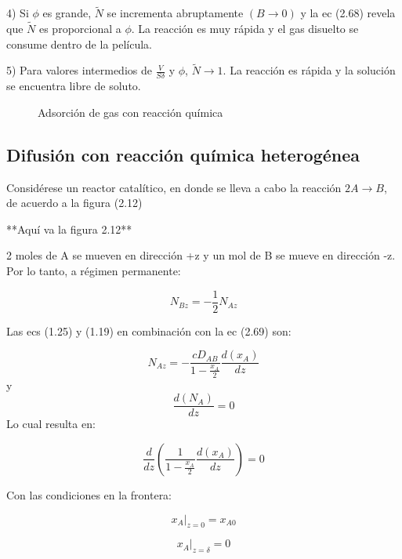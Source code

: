 4) Si $\phi$ es grande, $\widetilde{N}$ se incrementa abruptamente $(B\rightarrow 0)$ y la ec (2.68) revela que $\widetilde{N}$ es proporcional a $\phi$. La reacción es muy rápida y el gas disuelto se consume dentro de la película. 

5) Para valores intermedios de $\frac{V}{S\delta}$ y $\phi$, $\widetilde{N}\rightarrow1$. La reacción es rápida y la solución se encuentra libre de soluto. 

\begin{figure}
    \centering
    \caption{Adsorción de gas con reacción química}
\end{figure}


\subsection{Difusión con reacción química heterogénea}

Considérese un reactor catalítico, en donde se lleva a cabo la reacción $2A\rightarrow B$, de acuerdo a la figura (2.12)

**Aquí va la figura 2.12**

2 moles de A se mueven en dirección +z y un mol de B se mueve en dirección -z. Por lo tanto, a régimen permanente:

\begin{equation}
    N_{Bz}=-\frac{1}{2}N_{Az}
\end{equation}

Las ecs (1.25) y (1.19) en combinación con la ec (2.69) son:

\begin{equation}
    N_{Az}=-\frac{cD_{AB}}{1-\frac{x_A}{2}}\frac{d(x_A)}{dz}
\end{equation}
y 
\begin{equation}
    \frac{d(N_A)}{dz}=0
\end{equation}
Lo cual resulta en:

\begin{equation}
    \frac{d}{dz}(\frac{1}{1-\frac{x_A}{2}}\frac{d(x_A)}{dz})=0
\end{equation}

Con las condiciones en la frontera:

\begin{equation*}
    x_A|_{z=0}=x_{A0} 
\end{equation*}

\begin{equation}
    x_A|_{z=\delta}=0
\end{equation}

